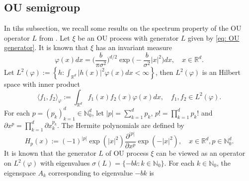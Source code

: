 \documentclass[12pt, a4paper]{amsart}
\theoremstyle{definition}
\numberwithin{equation}{section}
\begin{document}
\subsection{OU semigroup}
    In tihs subsection, we recall some results on the spectrum property of the OU operator $L$ from \cite{GD}.
    Let $\xi$ be an OU process with generator $L$ given by \eqref{eq: OU generator}.
    It is known that $\xi$ has an invariant measure
\begin{equation}
\label{invariantdensity}
    \varphi(x)dx
    =\Big (\frac{b}{\pi \sigma^2}\Big )^{d/2}\exp \Big(-\frac{b}{\sigma^2}|x|^2 \Big)dx,
    \quad x\in \mathbb{R}^d.
\end{equation}
    Let $L^2(\varphi):= \left\{ h: \int_{\mathbb{R}^d} |h(x)|^2 \varphi(x) dx < \infty \right\}$, then $L^2(\varphi)$ is an Hilbert space with inner product
\begin{equation}
    \langle f_1, f_2 \rangle_{\varphi}
    := \int_{\mathbb{R}^d}f_1(x)f_2(x)\varphi(x) dx, \quad f_1,f_2 \in L^2(\varphi).
\end{equation}
    For each $p = (p_k)_{k = 1}^d \in \mathbb{N}_0^{d}$, let $|p|=\sum_{k=1}^d p_k$, $p!= \prod_{k= 1}^d p_k !$ and $\partial x^p = \prod_{k = 1}^d\partial x_k^{p_k}$.
    The Hermite polynomials are defined by
\begin{equation}
    H_p(x)
    :=(-1)^{|p|}\exp(|x|^2) \frac{\partial ^{|p|}}{\partial x^p} \exp(-|x|^2) ,
    \quad x\in \mathbb R^d, p \in \mathbb{N}_0^{d}.
\end{equation}
    It is known that the generator $L$ of OU process $\xi$ can be viewed as an operator on $L^2(\varphi)$ with eigenvalues $\sigma(L)= \{-bk: k \in \mathbb N_0\}$.
    For each $k \in \mathbb N_0$, the eigenspace $A_k$ corresponding to eigenvalue $-bk$ is
\end{document}
